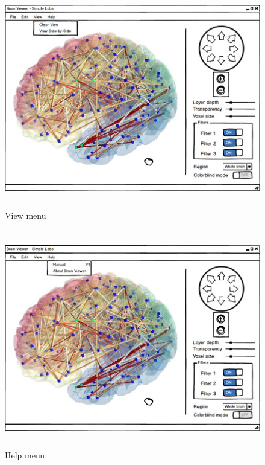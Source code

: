\begin{figure}[h!]
\centering
\includegraphics[width=16cm,height=9.5cm]{images/mockup4.png}
\caption{View menu}
\label{fig:viewMenu}
\end{figure}



\begin{figure}[h!]
\centering
\includegraphics[width=16cm,height=9.5cm]{images/mockup5.png}
\caption{Help menu}
\label{fig:helpMenu}
\end{figure}

\newpage
\newpage
\newpage

